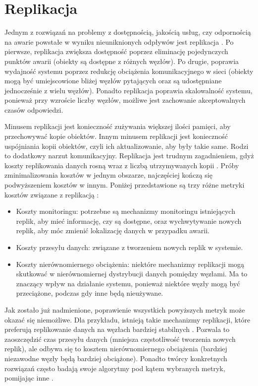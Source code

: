 \documentclass[12pt, twoside, openany]{report}
\begin{document}
\section{Replikacja}
\label{replikacja}

Jednym z rozwiązań na problemy z dostępnością, jakością usług, czy odpornością na awarie powstałe w wyniku nieuniknionych odpływów jest replikacja \cite{bib:martins}. Po pierwsze, replikacja zwiększa dostępność poprzez eliminację pojedynczych punktów awarii (obiekty są dostępne z różnych węzłów). Po drugie, poprawia wydajność systemu poprzez redukcję obciążenia komunikacyjnego w sieci (obiekty mogą być umiejscowione bliżej węzłów pytających oraz są udostępniane jednocześnie z wielu węzłów). Ponadto replikacja poprawia skalowalność systemu, ponieważ przy wzroście liczby węzłów, możliwe jest zachowanie akceptowalnych czasów odpowiedzi.

Minusem replikacji jest konieczność zużywania większej ilości pamięci, aby przechowywać kopie obiektów. Innym minusem replikacji jest konieczność uspójniania kopii obiektów, czyli ich aktualizowanie, aby były takie same. Rodzi to dodatkowy narzut komunikacyjny. Replikacja jest trudnym zagadnieniem, gdyż koszty replikowania danych rosną wraz z liczbą utrzymywanych kopii \cite{bib:rollerchain}. Próby zminimalizowania kosztów w jednym obszarze, najczęściej kończą się podwyższeniem kosztów w innym. Poniżej przedstawione są trzy różne metryki kosztów związane z replikacją \cite{bib:paiva}:
\begin{itemize}
\item Koszty monitoringu: potrzebne są mechanizmy monitoringu istniejących replik, aby mieć informację, czy są dostępne, oraz wychwytywanie nowych replik, aby móc zmienić lokalizację danych w przypadku awarii.
\item Koszty przesyłu danych: związane z tworzeniem nowych replik w systemie.
\item Koszty nierównomiernego obciążenia: niektóre mechanizmy replikacji mogą skutkować w nierównomiernej dystrybucji danych pomiędzy węzłami. Ma to znaczący wpływ na działanie systemu, ponieważ niektóre węzły mogą być przeciążone, podczas gdy inne będą nieużywane.
\end{itemize}

Jak zostało już nadmienione, poprawienie wszystkich powyższych metryk może okazać się niemożliwe. Dla przykładu, istnieją takie mechanizmy replikacji, które preferują replikowanie danych na węzłach bardziej stabilnych \cite{bib:paiva}. Pozwala to zaoszczędzić czas przesyłu danych (mniejsza częstotliwość tworzenia nowych replik), ale odbywa się to kosztem nierównomiernego obciążenia (bardziej niezawodne węzły będą bardziej obciążone). Ponadto twórcy konkretnych rozwiązań często badają swoje algorytmy pod kątem wybranych metryk, pomijając inne \cite{bib:paiva}.
\end{document}
